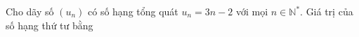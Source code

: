 \begin{ex}
Cho dãy số $(u_n)$ có số hạng tổng quát $u_n=3n-2$ với mọi $n\in\mathbb N^*$. Giá trị của số hạng thứ tư bằng
\end{ex}
